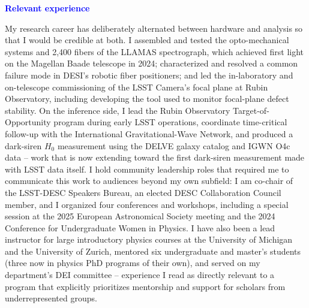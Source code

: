 \documentclass[11pt]{article}
\newcommand{\statement}[1]{\par\medskip
  \textcolor{blue}{\textbf{#1}}%
}
\begin{document}
\statement{Relevant experience}
My research career has deliberately alternated between hardware and analysis so that I would be credible at both. I assembled and tested the opto-mechanical systems and 2,400 fibers of the LLAMAS spectrograph, which achieved first light on the Magellan Baade telescope in 2024; characterized and resolved a common failure mode in DESI's robotic fiber positioners; and led the in-laboratory and on-telescope commissioning of the LSST Camera's focal plane at Rubin Observatory, including developing the tool used to monitor focal-plane defect stability. On the inference side, I lead the Rubin Observatory Target-of-Opportunity program during early LSST operations, coordinate time-critical follow-up with the International Gravitational-Wave Network, and produced a dark-siren $H_0$ measurement using the DELVE galaxy catalog and IGWN O4c data -- work that is now extending toward the first dark-siren measurement made with LSST data itself. I hold community leadership roles that required me to communicate this work to audiences beyond my own subfield: I am co-chair of the LSST-DESC Speakers Bureau, an elected DESC Collaboration Council member, and I organized four conferences and workshops, including a special session at the 2025 European Astronomical Society meeting and the 2024 Conference for Undergraduate Women in Physics. I have also been a lead instructor for large introductory physics courses at the University of Michigan and the University of Zurich, mentored six undergraduate and master's students (three now in physics PhD programs of their own), and served on my department's DEI committee -- experience I read as directly relevant to a program that explicitly prioritizes mentorship and support for scholars from underrepresented groups.
\end{document}
